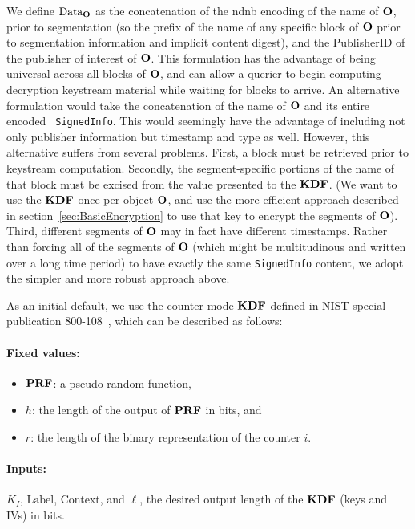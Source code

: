 We define $\mbox{Data}_{{\textbf{O}}}$ as the concatenation of the ndnb
encoding of the name of ${\textbf{O}}$, prior to segmentation (so the prefix
of the name of any specific block of ${\textbf{O}}$ prior to segmentation
information and implicit content digest), and the PublisherID of the
publisher of interest of ${\textbf{O}}$. This formulation has the advantage of
being universal across all blocks of ${\textbf{O}}$, and can allow a querier
to begin computing decryption keystream material while waiting for
blocks to arrive. An alternative formulation would take the
concatenation of the name of ${\textbf{O}}$ and its entire encoded {\tt
  SignedInfo}. This would seemingly have the advantage of including
not only publisher information but timestamp and type as
well. However, this alternative suffers from several problems. First,
a block must be retrieved prior to keystream computation. Secondly,
the segment-specific portions of the name of that block must be
excised from the value presented to the ${\textbf{KDF}}$. (We want to use the
${\textbf{KDF}}$ once per object ${\textbf{O}}$, and use the more efficient approach
described in section~\ref{sec:BasicEncryption} to use that key to
encrypt the segments of ${\textbf{O}}$). Third, different segments of ${\textbf{O}}$
may in fact have different timestamps. Rather than forcing all of the
segments of ${\textbf{O}}$ (which might be multitudinous and written over a
long time period) to have exactly the same {\tt SignedInfo} content,
we adopt the simpler and more robust approach above.

As an initial default, we use the counter mode ${\textbf{KDF}}$ defined in NIST
special publication 800-108~\cite{Chen2009}, which can be described as
follows:

\paragraph{Fixed values:}
\begin{itemize}
\item ${\textbf{PRF}}$: a pseudo-random function,
\item $h$: the length of the output of ${\textbf{PRF}}$ in bits, and
\item $r$: the length of the binary representation of the counter $i$. 
\end{itemize}

\paragraph{Inputs:} $K_I$, $\mbox{Label}$, Context, and $\ell$, the desired output length of the ${\textbf{KDF}}$ (keys and IVs) in bits.

